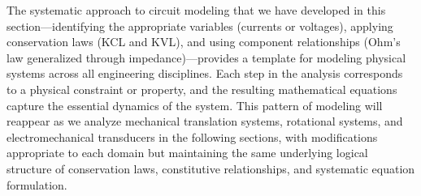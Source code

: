 The systematic approach to circuit modeling that we have developed in this section—identifying the appropriate variables (currents or voltages), applying conservation laws (KCL and KVL), and using component relationships (Ohm's law generalized through impedance)—provides a template for modeling physical systems across all engineering disciplines. Each step in the analysis corresponds to a physical constraint or property, and the resulting mathematical equations capture the essential dynamics of the system. This pattern of modeling will reappear as we analyze mechanical translation systems, rotational systems, and electromechanical transducers in the following sections, with modifications appropriate to each domain but maintaining the same underlying logical structure of conservation laws, constitutive relationships, and systematic equation formulation.
